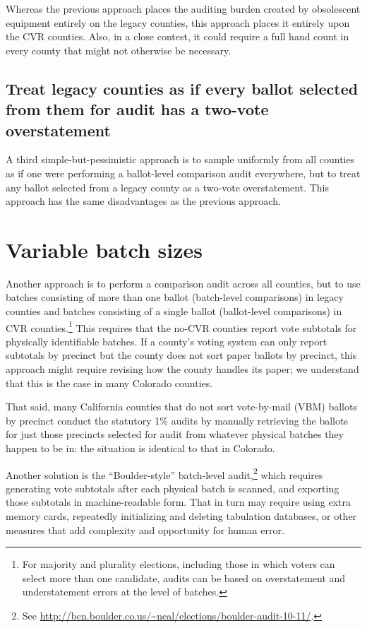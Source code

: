 \documentclass[12pt]{article}
\begin{document}
Whereas the previous approach places the auditing burden created by obsolescent equipment entirely on 
the legacy counties, this approach places it entirely upon the CVR counties. Also, in a close contest, it 
could require a full hand count in every county that might not otherwise be necessary.

\subsection{Treat legacy counties as if every ballot selected from them for audit has a two-vote overstatement}\label{sec:two-vote-over}
A third simple-but-pessimistic approach is to sample uniformly from all counties as if one
were performing a ballot-level comparison audit everywhere,  but to 
treat any ballot
selected from a legacy county as a two-vote overstatement. This approach has the same disadvantages
as the previous approach.

\section{Variable batch sizes} \label{sec:variable}

Another approach is to perform a comparison audit across all counties, but to use batches consisting
of more than one ballot (batch-level comparisons)
in legacy counties and batches consisting of a single ballot (ballot-level comparisons) in CVR counties.\footnote{%
 For majority and plurality elections, including those in which voters can select more than one candidate,
  audits can be based on overstatement and understatement errors at the level of batches.
}
This requires that the no-CVR counties report vote subtotals
for physically identifiable batches.
If a county's voting system can only report subtotals by precinct but 
the county does not sort paper ballots by
precinct, this approach might require revising how the county handles its
paper; we understand that this is the case in many Colorado counties.

That said, many California counties that do not sort vote-by-mail (VBM)
ballots by precinct conduct the statutory 1\% audits by manually retrieving the ballots 
for just those precincts selected for audit from whatever physical batches they happen to be in: 
the situation is identical to that in Colorado.

Another solution is the ``Boulder-style'' batch-level audit,\footnote{%
 See \url{http://bcn.boulder.co.us/~neal/elections/boulder-audit-10-11/}.
}
which requires generating 
vote subtotals after each physical batch is scanned, and exporting those subtotals in machine-readable form.
That in turn may require using extra memory cards, repeatedly initializing and deleting tabulation databases,
or other measures that add complexity and opportunity for human error.
\end{document}
